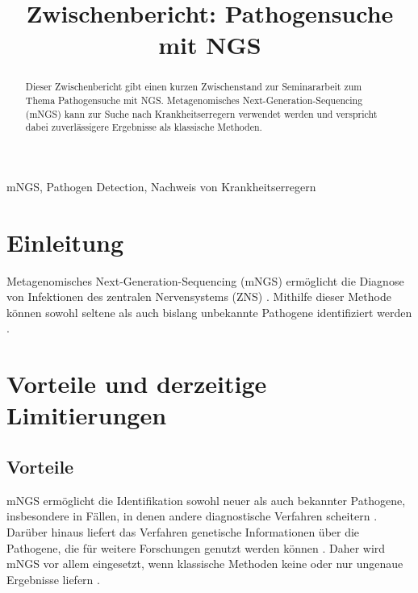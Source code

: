 \documentclass[a4paper, conference]{IEEEtran}
\newcommand{\quotationMarkGerman}[1]{\glqq{}#1\grqq{}}
\newcommand{\topic}{Zwischenbericht: Pathogensuche mit NGS}
\newcommand{\authorA}{Björn Emanuel Fürtges}
\newcommand{\indexTerms}{mNGS, Pathogen Detection, Nachweis von Krankheitserregern}
\begin{document}
\title{\topic
}

\author{\IEEEauthorblockN{\authorA}
}

\maketitle

\begin{abstract}
Dieser Zwischenbericht gibt einen kurzen Zwischenstand zur Seminararbeit zum Thema \quotationMarkGerman{Pathogensuche mit NGS}. Metagenomisches Next-Generation-Sequencing (mNGS) kann zur Suche nach Krankheitserregern verwendet werden und verspricht dabei zuverlässigere Ergebnisse als \quotationMarkGerman{klassische} Methoden.
\end{abstract}

\begin{IEEEkeywords}
\indexTerms
\end{IEEEkeywords}

\section{Einleitung}
Metagenomisches Next-Generation-Sequencing (mNGS) ermöglicht die Diagnose von Infektionen des zentralen Nervensystems (ZNS) \cite{clinicalMetagenomicNextGenerationSequencing}. Mithilfe dieser Methode können sowohl seltene als auch bislang unbekannte Pathogene identifiziert werden \cite{clinicalMetagenomicNextGenerationSequencing}.

\section{Vorteile und derzeitige Limitierungen}
\subsection{Vorteile}
mNGS ermöglicht die Identifikation sowohl neuer als auch bekannter Pathogene, insbesondere in Fällen, in denen andere diagnostische Verfahren scheitern \cite{clinicalMetagenomicNextGenerationSequencing}. Darüber hinaus liefert das Verfahren genetische Informationen über die Pathogene, die für weitere Forschungen genutzt werden können \cite{clinicalMetagenomicNextGenerationSequencing}. Daher wird mNGS vor allem eingesetzt, wenn \quotationMarkGerman{klassische} Methoden keine oder nur ungenaue Ergebnisse liefern \cite{weiGuSteveMillerCharlesChiuMNGSPathogenDetection}.
\end{document}
